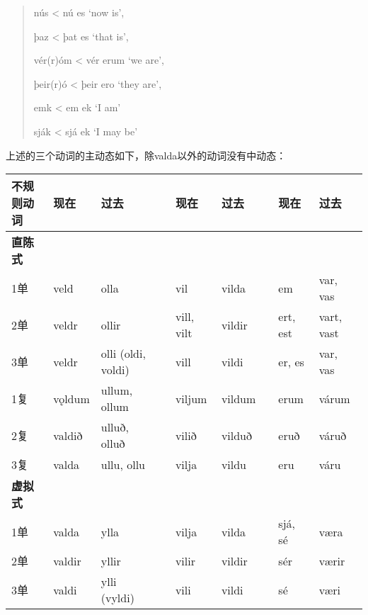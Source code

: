 \begin{quote}
  nús \textless{} nú es `now is‌',

  þaz \textless{} þat es `that is‌',

  vér(r)óm \textless{} vér erum `we are‌',

  þeir(r)ó \textless{} þeir ero `they are‌',

  emk \textless{} em ek `I am'

  sják \textless{} sjá ek `I may be'
\end{quote}

上述的三个动词的主动态如下，除valda以外的动词没有中动态：

\begin{longtable}{lllllllll}
  \toprule
  不规则动词         & 现在       & 过去                 &  & 现在         & 过去     &  & 现在       & 过去         \\
  \midrule
  \endhead
  \bottomrule
  \endfoot
  \textbf{直陈式}  &          &                    &  &            &        &  &          &            \\
  1单            & veld     & olla               &  & vil        & vilda  &  & em       & var, vas   \\
  2单            & veldr    & ollir              &  & vill, vilt & vildir &  & ert, est & vart, vast \\
  3单            & veldr    & olli (oldi, voldi) &  & vill       & vildi  &  & er, es   & var,
  vas                                                                                               \\
  1复            & vǫldum   & ullum, ollum       &  & viljum     & vildum &  & erum     & várum      \\
  2复            & valdið   & ulluð, olluð       &  & vilið      & vilduð &  & eruð     & váruð      \\
  3复            & valda    & ullu, ollu         &  & vilja      & vildu  &  & eru      & váru       \\
  \textbf{虚拟式}  &          &                    &  &            &        &  &          &            \\
  1单            & valda    & ylla               &  & vilja      & vilda  &  & sjá, sé  & væra       \\
  2单            & valdir   & yllir              &  & vilir      & vildir &  & sér      & værir      \\
  3单            & valdi    & ylli (vyldi)       &  & vili       & vildi  &  & sé       & væri       \\

\end{longtable}
